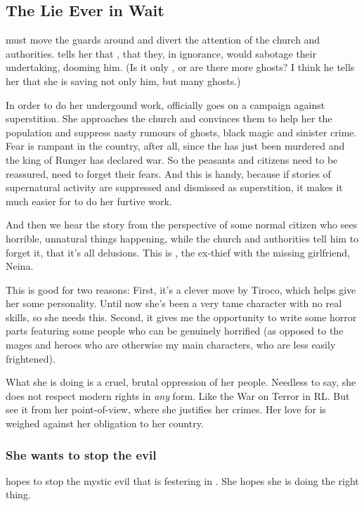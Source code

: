 \subsection{The \Qliphoth{} Lie Ever in Wait}
\Tiroco{} must move the guards around and divert the attention of the church and authorities. \Icor{} tells her that , that they, in ignorance, would sabotage their undertaking, dooming him. (Is it only \Icor{}, or are there more ghosts? I think he tells her that she is saving not only him, but many ghosts.) 

In order to do her undergound work, \Tiroco{} officially goes on a campaign against superstition. She approaches the church and convinces them to help her  the population and suppress nasty rumours of ghosts, black magic and sinister crime. 
Fear is rampant in the country, after all, since the \rayuth has just been murdered and the king of Runger has declared war. So the peasants and citizens need to be reassured, need to forget their fears. 
And this is handy, because if stories of supernatural activity are suppressed and dismissed as superstition, it makes it much easier for \Tiroco{} to do her furtive work. 

And then we hear the story from the perspective of some normal citizen who sees horrible, unnatural things happening, while the church and authorities tell him to forget it, that it's all delusions. This is , the ex-thief with the missing girlfriend, Neina. 

This is good for two reasons: 
First, it's a clever move by Tiroco, which helps give her some personality. Until now she's been a very tame character with no real skills, so she needs this. 
Second, it gives me the opportunity to write some horror parts featuring some  people who can be genuinely horrified (as opposed to the mages and heroes who are otherwise my main characters, who are less easily frightened). 

What she is doing is a cruel, brutal oppression of her people. Needless to say, she does not respect modern \human{} rights in \emph{any} form. Like the War on Terror in RL. But see it from her point-of-view, where she justifies her crimes. Her love for \Icor{} is weighed against her obligation to her country. 





\subsubsection{She wants to stop the evil}
\Tiroco{} hopes to stop the mystic evil that is festering in \Malcur. 
She hopes she is doing the right thing. 









